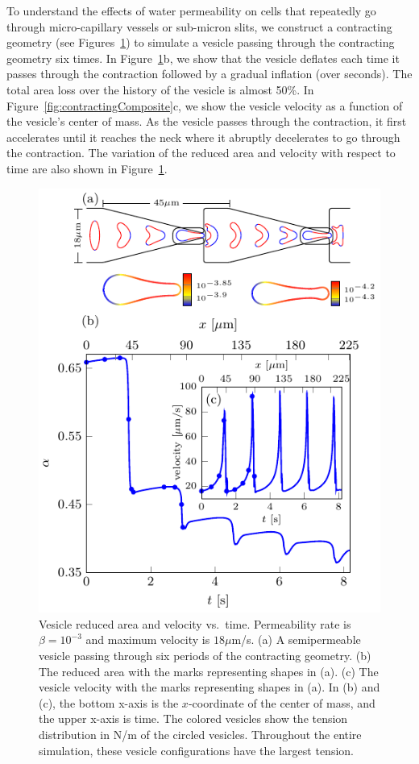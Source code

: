 \documentclass[9pt,twocolumn,twoside,lineno]{pnas-new}
\newif\ifTikz
\begin{document}
To understand the effects of water permeability on cells that repeatedly
go through micro-capillary vessels or sub-micron slits, we construct a
contracting geometry (see Figures~\ref{fig:contractingComposite2}) to
simulate a vesicle passing through the contracting geometry six times.
In Figure~\ref{fig:contractingComposite2}b, we show that the vesicle
deflates each time it passes through the contraction followed by a
gradual inflation (over seconds). The total area loss over the history
of the vesicle is almost 50\%. In
Figure~\ref{fig:contractingComposite}c, we show the vesicle velocity as
a function of the vesicle's center of mass. As the vesicle passes
through the contraction, it first accelerates until it reaches the neck
where it abruptly decelerates to go through the contraction. The
variation of the reduced area and velocity with respect to time are also
shown in Figure~\ref{fig:contractingComposite2}.
\begin{figure}[hbp]
  \centering
  \ifTikz
  
  \else
  \includegraphics{figures/contractingComposite2.pdf}
  \fi
  \caption{\label{fig:contractingComposite2} Vesicle reduced area and
  velocity vs.~time. Permeability rate is $\beta = 10^{-3}$ and maximum
  velocity is $18\mu$m/s. (a) A semipermeable vesicle passing through
  six periods of the contracting geometry. (b) The reduced area with
  the marks representing shapes in (a). (c) The vesicle velocity with
  the marks representing shapes in (a). In (b) and (c), the bottom
  x-axis is the $x$-coordinate of the center of mass, and the upper
  x-axis is time. The colored vesicles show the tension distribution in
  N/m of the circled vesicles. Throughout the entire simulation, these
  vesicle configurations have the largest tension.}
\end{figure}
\end{document}
